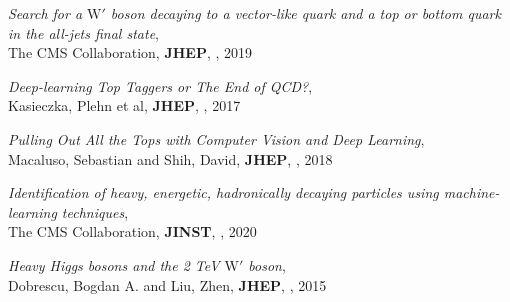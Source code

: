\documentclass[12pt]{article}
\begin{document}
\begin{flushleft}
\begin{thebibliography}{1}
  \textit{Search for a $\mathrm{W'}$ boson decaying to a vector-like quark and a top or bottom quark in the all-jets final state},\\
The CMS Collaboration, \textbf{JHEP}, , 2019

  \textit{Deep-learning Top Taggers or The End of QCD?},\\
 Kasieczka, Plehn et al, \textbf{JHEP}, , 2017

  \textit{Pulling Out All the Tops with Computer Vision and Deep Learning},\\
 Macaluso, Sebastian and Shih, David, \textbf{JHEP}, , 2018


  \textit{Identification of heavy, energetic, hadronically decaying particles using machine-learning techniques},\\
 The CMS Collaboration, \textbf{JINST}, , 2020


   \textit{Heavy Higgs bosons and the 2 TeV $\mathrm{W'}$ boson},\\
  Dobrescu, Bogdan A. and Liu, Zhen, \textbf{JHEP}, , 2015

\end{thebibliography}
\end{flushleft}


%
%
\end{document}
